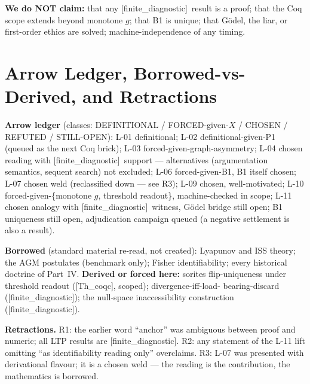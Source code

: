 \documentclass[11pt,a4paper,twoside]{book}
\newcommand{\tier}[1]{\textnormal{\small\textsf{[#1]}}}
\newcommand{\coq}{\tier{Th\_coqc}}\newcommand{\fd}{\tier{finite\_diagnostic}}
\theoremstyle{plain}
\theoremstyle{definition}
\theoremstyle{remark}
\begin{document}
\noindent\textbf{We do NOT claim:} that any \fd\ result is a proof; that the
Coq scope extends beyond monotone $g$; that B1 is unique; that G\"odel, the
liar, or first-order ethics are solved; machine-independence of any timing.

\chapter{Arrow Ledger, Borrowed-vs-Derived, and Retractions}

\textbf{Arrow ledger} (classes: DEFINITIONAL / FORCED-given-$X$ / CHOSEN /
REFUTED / STILL-OPEN): L-01 definitional; L-02 definitional-given-P1 (queued
as the next Coq brick); L-03 forced-given-graph-asymmetry; L-04 chosen
reading with \fd\ support --- alternatives (argumentation semantics, sequent
search) not excluded; L-06 forced-given-B1, B1 itself chosen; L-07 chosen
weld (reclassified down --- see R3); L-09 chosen, well-motivated; L-10
forced-given-\{monotone $g$, threshold readout\}, machine-checked in scope;
L-11 chosen analogy with \fd\ witness, G\"odel bridge still open; B1
uniqueness still open, adjudication campaign queued (a negative settlement is
also a result).

\textbf{Borrowed} (standard material re-read, not created): Lyapunov and ISS
theory; the AGM postulates (benchmark only); Fisher identifiability; every
historical doctrine of Part~IV. \textbf{Derived or forced here:} sorites
flip-uniqueness under threshold readout (\coq, scoped); divergence-iff-load-
bearing-discard (\fd); the null-space inaccessibility construction (\fd).

\textbf{Retractions.} R1: the earlier word ``anchor'' was ambiguous between
proof and numeric; all LTP results are \fd. R2: any statement of the L-11
lift omitting ``as identifiability reading only'' overclaims. R3: L-07 was
presented with derivational flavour; it is a chosen weld --- the reading is
the contribution, the mathematics is borrowed.
\end{document}
